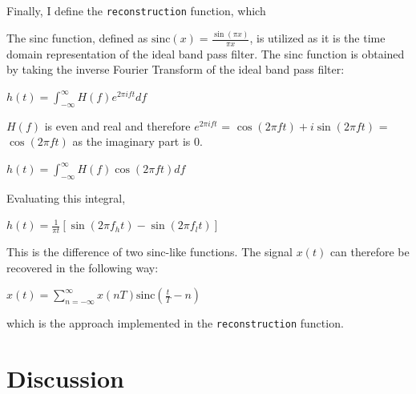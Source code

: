 \documentclass{article}
\begin{document}
Finally, I define the \verb|reconstruction| function, which 

The sinc function, defined as $\text{sinc}(x) = \frac{\sin(\pi x)}{\pi x}$, is utilized as it is the time domain representation of the ideal band pass filter.
The sinc function is obtained by taking the inverse Fourier Transform of the ideal band pass filter:
\begin{center}
    \begin{math}
        h(t) = \displaystyle \int_{-\infty}^{\infty} H(f) e^{2\pi i ft} df
    \end{math}  
\end{center}
$H(f)$ is even and real and therefore $e^{2\pi i ft}$ = $\cos(2\pi ft) + i \sin(2\pi ft)$ = $\cos(2\pi ft)$ as the imaginary part is 0.  
\begin{center}
    \begin{math}
        h(t) = \displaystyle \int_{-\infty}^{\infty} H(f) \cos(2\pi ft) df
    \end{math}  
\end{center}
Evaluating this integral,
\begin{center}
    \begin{math}
        h(t) = \frac{1}{\pi t} \left[ \sin(2\pi f_h t) - \sin(2\pi f_l t) \right]
    \end{math}  
\end{center}
This is the difference of two sinc-like functions. 
The signal $x(t)$ can therefore be recovered in the following way:
\begin{center}
    \begin{math}
        x(t) = \displaystyle\sum_{n=-\infty}^{\infty} x(nT) \text{sinc}\left( \frac{t}{T} - n \right)
    \end{math}  
\end{center}
which is the approach implemented in the \verb|reconstruction| function. 

\section{Discussion}

\end{document}
